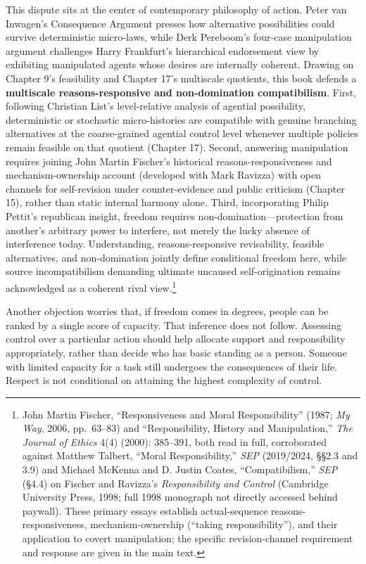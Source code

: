 \documentclass[
  english,
  11pt,
  oneside]{book}
\begin{document}
This dispute sits at the center of contemporary philosophy of action. Peter van Inwagen's Consequence Argument presses how alternative possibilities could survive deterministic micro-laws, while Derk Pereboom's four-case manipulation argument challenges Harry Frankfurt's hierarchical endorsement view by exhibiting manipulated agents whose desires are internally coherent. Drawing on Chapter 9's feasibility and Chapter 17's multiscale quotients, this book defends a \textbf{multiscale reasons-responsive and non-domination compatibilism}. First, following Christian List's level-relative analysis of agential possibility, deterministic or stochastic micro-histories are compatible with genuine branching alternatives at the coarse-grained agential control level whenever multiple policies remain feasible on that quotient (Chapter 17). Second, answering manipulation requires joining John Martin Fischer's historical reasons-responsiveness and mechanism-ownership account (developed with Mark Ravizza) with open channels for self-revision under counter-evidence and public criticism (Chapter 15), rather than static internal harmony alone. Third, incorporating Philip Pettit's republican insight, freedom requires non-domination---protection from another's arbitrary power to interfere, not merely the lucky absence of interference today. Understanding, reasons-responsive revisability, feasible alternatives, and non-domination jointly define conditional freedom here, while source incompatibilism demanding ultimate uncaused self-origination remains acknowledged as a coherent rival view.\footnote{\hypertarget{ph-note-54}{}John Martin Fischer, ``Responsiveness and Moral Responsibility'' (1987; \emph{My Way}, 2006, pp.~63--83) and ``Responsibility, History and Manipulation,'' \emph{The Journal of Ethics} 4(4) (2000): 385--391, both read in full, corroborated against Matthew Talbert, ``Moral Responsibility,'' \emph{SEP} (2019/2024, §§2.3 and 3.9) and Michael McKenna and D. Justin Coates, ``Compatibilism,'' \emph{SEP} (§4.4) on Fischer and Ravizza's \emph{Responsibility and Control} (Cambridge University Press, 1998; full 1998 monograph not directly accessed behind paywall). These primary essays establish actual-sequence reasons-responsiveness, mechanism-ownership (``taking responsibility''), and their application to covert manipulation; the specific revision-channel requirement and response are given in the main text.}

Another objection worries that, if freedom comes in degrees, people can be ranked by a single score of capacity. That inference does not follow. Assessing control over a particular action should help allocate support and responsibility appropriately, rather than decide who has basic standing as a person. Someone with limited capacity for a task still undergoes the consequences of their life. Respect is not conditional on attaining the highest complexity of control.
\end{document}

